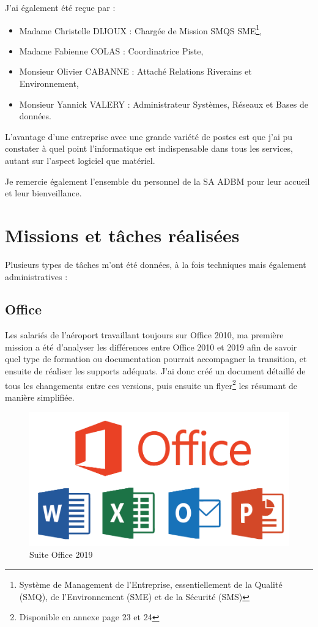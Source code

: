J'ai également été reçue par :

\begin{itemize}
    \item Madame Christelle DIJOUX : Chargée de Mission SMQS SME\footnote{Système de Management de l'Entreprise, essentiellement de la Qualité (SMQ), de l'Environnement (SME) et de la Sécurité (SMS)},
    \item Madame Fabienne COLAS : Coordinatrice Piste,
    \item Monsieur Olivier CABANNE : Attaché Relations Riverains et Environnement,
    \item Monsieur Yannick VALERY : Administrateur Systèmes, Réseaux et Bases de données.\newline
\end{itemize}

L'avantage d'une entreprise avec une grande variété de postes est que j'ai pu constater à quel point l'informatique est indispensable dans tous les services, autant sur l'aspect logiciel que matériel.

Je remercie également l'ensemble du personnel de la SA ADBM pour leur accueil et leur bienveillance. 

\section{Missions et tâches réalisées}

Plusieurs types de tâches m’ont été données, à la fois techniques mais également administratives :\

\subsection{Office}

Les salariés de l’aéroport travaillant toujours sur Office 2010, ma première mission a été d’analyser les différences entre Office 2010 et 2019 afin de savoir quel type de formation ou documentation pourrait accompagner la transition, et ensuite de réaliser les supports adéquats. J’ai donc créé un document détaillé de tous les changements entre ces versions, puis ensuite un flyer\footnote{Disponible en annexe page 23 et 24} les résumant de manière simplifiée.\newline


\begin{figure}[hbt!]
  \centering
  \includegraphics[width=12cm]{Images/office.png}
  \caption{Suite Office 2019}
  \label{fig:office}
\end{figure}

